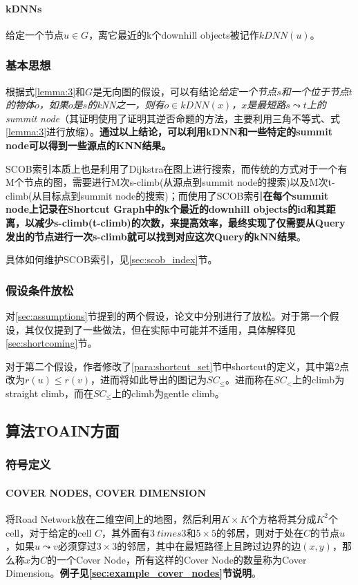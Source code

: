 \documentclass{ML}
\begin{document}
\paragraph{$\mathbf{kDNNs}$}
给定一个节点$u \in G$，离它最近的k个downhill objects被记作$kDNN(u)$。

\subsubsection{基本思想}\label{sec:scob_basic}
根据式\eqref{lemma:3}和$G$是无向图的假设，可以有结论\textit{给定一个节点$s$和一个位于节点$t$的物体$o$，如果$o$是$s$的kNN之一，则有$o \in kDNN(x)$，$x$是最短路$s \leadsto t$上的summit node}（其证明使用了证明其逆否命题的方法，主要利用三角不等式、式\eqref{lemma:3}进行放缩）。\textbf{通过以上结论，可以利用kDNN和一些特定的summit node可以得到一些源点的KNN结果。}

SCOB索引本质上也是利用了Dijkstra在图上进行搜索，而传统的方式对于一个有M个节点的图，需要进行M次s-climb(从源点到summit node的搜索)以及M次t-climb(从目标点到summit node的搜索)；而使用了SCOB索引\textbf{在每个summit node上记录在Shortcut Graph中的k个最近的downhill objects的id和其距离，以减少s-climb(t-climb)的次数，来提高效率，最终实现了仅需要从Query发出的节点进行一次s-climb就可以找到对应这次Query的kNN结果}。

具体如何维护SCOB索引，见\ref{sec:scob_index}节。

\subsubsection{假设条件放松}\label{sec:assumptions_release}
对\ref{sec:assumptions}节提到的两个假设，论文中分别进行了放松。对于第一个假设，其仅仅提到了一些做法，但在实际中可能并不适用，具体解释见\ref{sec:shortcoming}节。

对于第二个假设，作者修改了\ref{para:shortcut_set}节中shortcut的定义，其中第2点改为$r(u) \leq r(v)$，进而将如此导出的图记为$SC_{\leq}$。进而称在$SC_{<}$上的climb为straight climb，而在$SC_{\leq}$上的climb为gentle climb。
\subsection{算法TOAIN方面}
\subsubsection{符号定义}\label{sec:toain_def}
\paragraph{COVER NODES, COVER DIMENSION}
将Road Network放在二维空间上的地图，然后利用$K \times K$个方格将其分成$K^2$个cell，对于给定的cell $C$，其外面有$3 \ times 3$和$5 \times 5$的邻居，则对于处在$C$的节点$u$，如果$u \leadsto v$必须穿过$3 \times 3$的邻居，其中在最短路径上且跨过边界的边$(x, y)$，那么称$x$为$C$的一个Cover Node，所有这样的Cover Node的数量称为Cover Dimension。\textbf{例子见\ref{sec:example_cover_nodes}节说明}。
\end{document}

